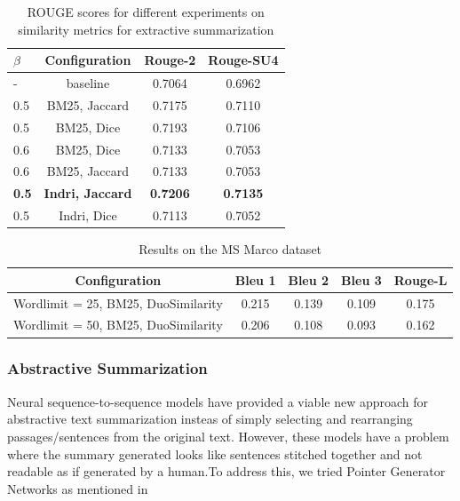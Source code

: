 \begin{table}[t!]
    \centering
    \begin{tabular}{|l|c|c|c|}
         \hline
            $\beta$& Configuration & Rouge-2 & Rouge-SU4 \\
        \hline
        \hline
        - & baseline & 0.7064 & 0.6962 \\
        \hline
        0.5 & BM25, Jaccard  & 0.7175 & 0.7110  \\ 
        \hline
        0.5 & BM25, Dice & 0.7193 & 0.7106  \\ 
        \hline
        0.6 & BM25, Dice & 0.7133 & 0.7053  \\ 
        \hline
        0.6 & BM25, Jaccard & 0.7133 & 0.7053  \\
        \hline
        \textbf{0.5} & \textbf{ Indri, Jaccard} & \textbf{0.7206} & \textbf{0.7135}  \\ 
        \hline
         0.5 & Indri, Dice & 0.7113 & 0.7052  \\ 
        \hline
    \end{tabular}
    \caption{ROUGE scores for different experiments on similarity metrics for extractive summarization}
    \label{tab:rouge_extractive_summarization}
\end{table}

\begin{table}[t]
    \centering
    \begin{tabular}{|c|c|c|c|c|} \hline
    \textbf{Configuration} & \textbf{Bleu 1} & \textbf{Bleu 2} & \textbf{Bleu 3} & \textbf{Rouge-L} \\
    \hline
      Wordlimit = 25, BM25, DuoSimilarity & 0.215 & 0.139 & 0.109 & 0.175\\
     \hline
     Wordlimit = 50, BM25, DuoSimilarity &  0.206 & 0.108 & 0.093 & 0.162\\
    \hline
    \end{tabular}
    \caption{Results on the MS Marco dataset}
    \label{tab:ms_marco_ext_res}
\end{table}

\subsubsection{Abstractive Summarization}
Neural sequence-to-sequence models have provided a viable new approach for abstractive text summarization insteas of simply selecting and rearranging passages/sentences from the original text. However, these models have a problem where the summary generated looks like sentences stitched together and not readable as if generated by a human.To address this, we tried Pointer Generator Networks as mentioned in \cite{PGC}

